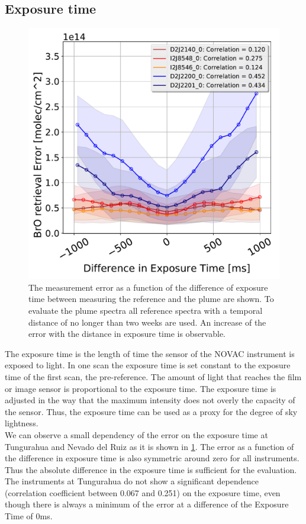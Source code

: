 \subsection{Exposure time}
\begin{figure}
	\centering
	\includegraphics[width=0.7\linewidth]{Bilder/DiffExpTimeallInstruments}
	\caption{The   measurement error as a function of the difference of exposure time between measuring the reference and the plume are shown. To evaluate the plume spectra all reference spectra with a temporal distance of no longer than two weeks are used. An increase of the  error with the distance in exposure time is observable.}
	\label{fig:diffexptime}
\end{figure}
The  exposure time is the length of time the sensor of the NOVAC instrument is exposed to light. In one scan the exposure time is set constant to the exposure time of the first scan, the pre-reference. The amount of light that reaches the film or image sensor is proportional to the exposure time. The exposure time is adjusted in the way that the maximum intensity does not overly the capacity of the sensor. Thus, the exposure time can be used as a proxy for the degree of sky lightness.\\
We can observe a small dependency of the  error on the exposure time at Tungurahua and Nevado del Ruiz as it is shown in \cref{fig:diffexptime}. The   error as a function of the difference in exposure time is also symmetric around zero for all instruments. Thus the absolute difference in the exposure time is sufficient for the evaluation.\\
The instruments at Tungurahua do not show a significant dependence (correlation coefficient between 0.067 and 0.251) on the exposure time, even though there is always a minimum of the  error at a difference of the Exposure Time of 0ms.\\
